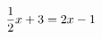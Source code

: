 \documentclass[preview]{standalone}
\begin{document}
\begin{align*}
\special{dvisvgm:raw <g id='unique000'>}\frac{1}{2}x+3=2x-1\special{dvisvgm:raw </g>}
\end{align*}
\end{document}

